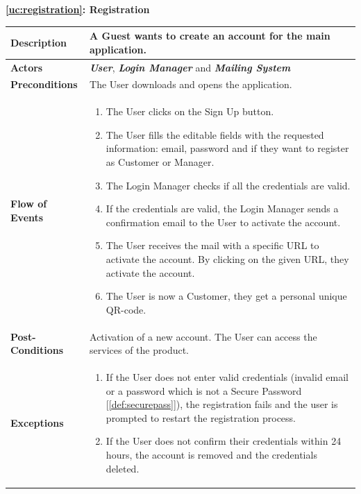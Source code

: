 \documentclass[a4paper, 12pt, oneside]{article}
\begin{document}
\begin{center}
{\textbf{\ref{uc:registration}: Registration}}
\end{center}
\begin{tabularx}{\linewidth}{| l | X |}
	
	\hline
	\textbf{Description} & A Guest wants to create an account for the main application.\\
	

	\hline
	\textbf{Actors} & \textbf{\textit{User}}, \textbf{\textit{Login Manager}} and \textbf{\textit{Mailing System}}\\
	
	\hline
	\textbf{Preconditions} & The User downloads and opens the application.\\
	
	\hline
	\textbf{Flow of Events} & \parbox{0.7\textwidth}{	
		\begin{enumerate}
			\item The User clicks on the Sign Up button.
			\item The User fills the editable fields with the requested information: email, password and if they want to register as Customer or Manager.
			\item The Login Manager checks if all the credentials are valid.
			\item If the credentials are valid, the Login Manager sends a confirmation email to the User to activate the account.
			\item The User receives the mail with a specific URL to activate the account. By clicking on the given URL, they activate the account.
			\item The User is now a Customer, they get a personal unique QR-code.
	\end{enumerate}}\\
	
	\hline
	\textbf{Post-Conditions} & Activation of a new account. The User can access the services of the product.\\
	
	\hline
	\textbf{Exceptions} & \parbox{0.7\textwidth}{ \begin{enumerate}
			\item If the User does not enter valid credentials (invalid email or a password which is not a Secure Password [\ref{def:securepass}]), the registration fails and the user is prompted to restart the registration process.
			\item If the User does not confirm their credentials within 24 hours, the account is removed and the credentials deleted.
		\end{enumerate}}\\

	\hline
	
\end{tabularx}
\end{document}
